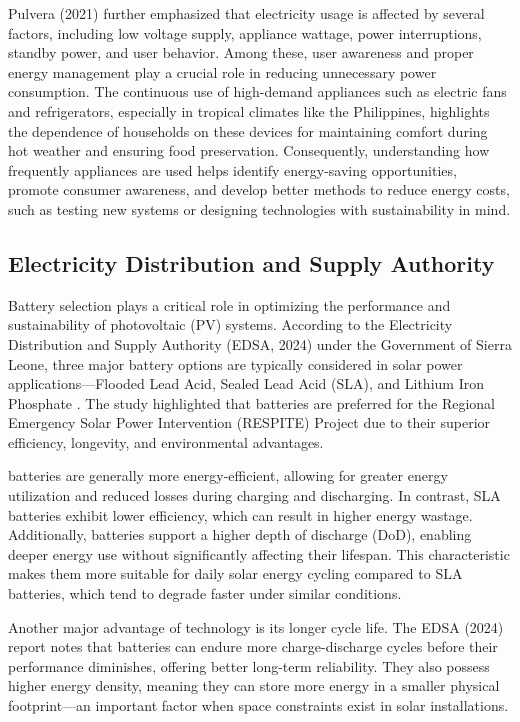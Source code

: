 {Pulvera (2021) further emphasized that electricity usage is affected by several factors, including low voltage supply, appliance wattage, power interruptions, standby power, and user behavior. Among these, user awareness and proper energy management play a crucial role in reducing unnecessary power consumption. The continuous use of high-demand appliances such as electric fans and refrigerators, especially in tropical climates like the Philippines, highlights the dependence of households on these devices for maintaining comfort during hot weather and ensuring food preservation. Consequently, understanding how frequently appliances are used helps identify energy-saving opportunities, promote consumer awareness, and develop better methods to reduce energy costs, such as testing new systems or designing technologies with sustainability in mind.

\subsection{Electricity Distribution and Supply Authority} 
Battery selection plays a critical role in optimizing the performance and sustainability of photovoltaic (PV) systems. According to the Electricity Distribution and Supply Authority (EDSA, 2024) under the Government of Sierra Leone, three major battery options are typically considered in solar power applications—Flooded Lead Acid, Sealed Lead Acid (SLA), and Lithium Iron Phosphate  . The study highlighted that   batteries are preferred for the Regional Emergency Solar Power Intervention (RESPITE) Project due to their superior efficiency, longevity, and environmental advantages.

  batteries are generally more energy-efficient, allowing for greater energy utilization and reduced losses during charging and discharging. In contrast, SLA batteries exhibit lower efficiency, which can result in higher energy wastage. Additionally,   batteries support a higher depth of discharge (DoD), enabling deeper energy use without significantly affecting their lifespan. This characteristic makes them more suitable for daily solar energy cycling compared to SLA batteries, which tend to degrade faster under similar conditions.

Another major advantage of   technology is its longer cycle life. The EDSA (2024) report notes that  batteries can endure more charge-discharge cycles before their performance diminishes, offering better long-term reliability. They also possess higher energy density, meaning they can store more energy in a smaller physical footprint—an important factor when space constraints exist in solar installations.

}
